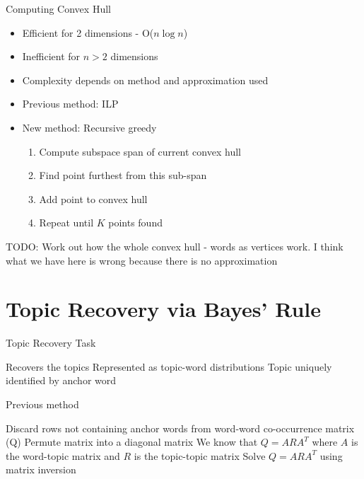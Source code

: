 \documentclass{lecture}
\begin{document}
\begin{plain}{Computing Convex Hull}
\begin{itemize}
\item Efficient for 2 dimensions - O($n\log{n}$)
\item Inefficient for $n>2$ dimensions
\item Complexity depends on method and approximation used
\item Previous method: ILP
\item New method: Recursive greedy
\begin{enumerate}
\item Compute subspace span of current convex hull
\item Find point furthest from this sub-span
\item Add point to convex hull
\item Repeat until $K$ points found
\end{enumerate}
\end{itemize}
TODO: Work out how the whole convex hull - words as vertices work. I think what we have here is wrong because there is no approximation
\end{plain}

\section[Topic Recovery]{Topic Recovery via Bayes' Rule}
\begin{plain}{Topic Recovery Task}
\begin{itemize}
\p Recovers the topics
\p Represented as topic-word distributions
\p Topic uniquely identified by anchor word
\end{itemize}
\end{plain}

\begin{plain}{Previous method}
\begin{enumerate}
\p Discard rows not containing anchor words from word-word co-occurrence matrix (Q)
\p Permute matrix into a diagonal matrix
\p We know that $Q=ARA^T$ where $A$ is the word-topic matrix and $R$ is the topic-topic matrix
\p Solve $Q = ARA^T$ using matrix inversion
\end{enumerate}
\end{plain}
\end{document}

